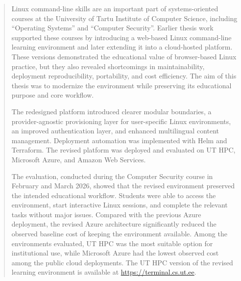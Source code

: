 \newpage
{} %

\begin{info}
  \begin{abstract}
    Linux command-line skills are an important part of systems-oriented courses at the University of Tartu Institute of Computer Science, including ``Operating Systems'' and ``Computer Security''.
    Earlier thesis work supported these courses by introducing a web-based Linux command-line learning environment and later extending it into a cloud-hosted platform.
    These versions demonstrated the educational value of browser-based Linux practice, but they also revealed shortcomings in maintainability, deployment reproducibility, portability, and cost efficiency.
    The aim of this thesis was to modernize the environment while preserving its educational purpose and core workflow.

    The redesigned platform introduced clearer modular boundaries, a provider-agnostic provisioning layer for user-specific Linux environments, an improved authentication layer, and enhanced multilingual content management.
    Deployment automation was implemented with Helm and Terraform.
    The revised platform was deployed and evaluated on UT HPC, Microsoft Azure, and Amazon Web Services.

    The evaluation, conducted during the Computer Security course in February and March 2026, showed that the revised environment preserved the intended educational workflow.
    Students were able to access the environment, start interactive Linux sessions, and complete the relevant tasks without major issues.
    Compared with the previous Azure deployment, the revised Azure architecture significantly reduced the observed baseline cost of keeping the environment available.
    Among the environments evaluated, UT HPC was the most suitable option for institutional use, while Microsoft Azure had the lowest observed cost among the public cloud deployments.
    The UT HPC version of the revised learning environment is available at \url{https://terminal.cs.ut.ee}.
  \end{abstract}


\end{info}


